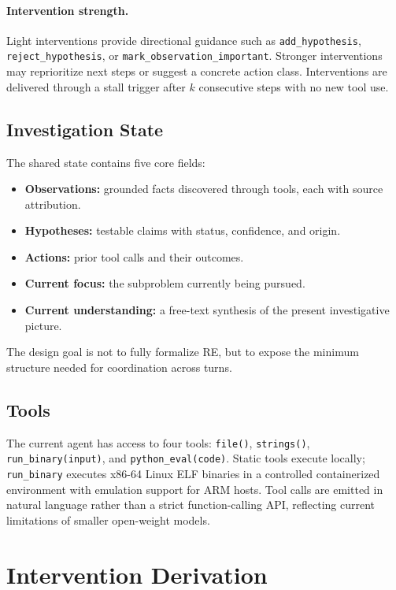 \documentclass[letterpaper]{article}
\begin{document}
\paragraph{Intervention strength.}
Light interventions provide directional guidance such as \texttt{add\_hypothesis}, \texttt{reject\_hypothesis}, or \texttt{mark\_observation\_important}.
Stronger interventions may reprioritize next steps or suggest a concrete action class.
Interventions are delivered through a stall trigger after $k$ consecutive steps with no new tool use.

\subsection{Investigation State}

The shared state contains five core fields:
\begin{itemize}[leftmargin=1.2em]
    \item \textbf{Observations:} grounded facts discovered through tools, each with source attribution.
    \item \textbf{Hypotheses:} testable claims with status, confidence, and origin.
    \item \textbf{Actions:} prior tool calls and their outcomes.
    \item \textbf{Current focus:} the subproblem currently being pursued.
    \item \textbf{Current understanding:} a free-text synthesis of the present investigative picture.
\end{itemize}

The design goal is not to fully formalize RE, but to expose the minimum structure needed for coordination across turns.

\subsection{Tools}

The current agent has access to four tools: \texttt{file()}, \texttt{strings()}, \texttt{run\_binary(input)}, and \texttt{python\_eval(code)}.
Static tools execute locally; \texttt{run\_binary} executes x86-64 Linux ELF binaries in a controlled containerized environment with emulation support for ARM hosts.
Tool calls are emitted in natural language rather than a strict function-calling API, reflecting current limitations of smaller open-weight models.

\section{Intervention Derivation}
\end{document}
